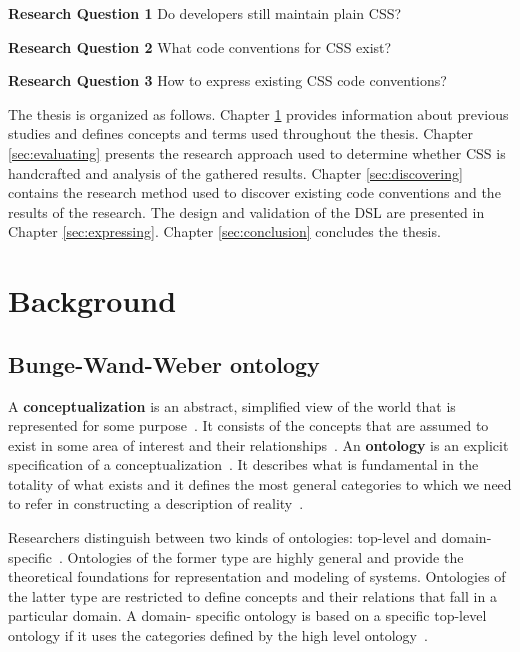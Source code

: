 \documentclass[parskip=full]{uvamscse}
\begin{document}
  \begin{description}
    \item \textbf{Research Question 1} Do developers still maintain plain CSS?
    \item \textbf{Research Question 2} What code conventions for CSS exist?
    \item \textbf{Research Question 3} How to express existing CSS code conventions?
  \end{description}

The thesis is organized as follows. Chapter \ref{sec:background} provides information about previous
studies and defines concepts and terms used throughout the thesis. Chapter \ref{sec:evaluating}
presents the research approach used to determine whether CSS is handcrafted and analysis of the
gathered results. Chapter \ref{sec:discovering} contains the research method  used to discover
existing code conventions and the results of the research. The design and validation of the DSL are
presented in Chapter \ref{sec:expressing}. Chapter \ref{sec:conclusion} concludes the thesis.


\chapter{Background}
\label{sec:background}

\section{Bunge-Wand-Weber ontology}

A \textbf{conceptualization} is an abstract, simplified view of the world that is represented for
some purpose~\cite{gruber1995toward}. It consists of the concepts that are assumed to exist in some
area of interest and their relationships~\cite{gruber1995toward}. An \textbf{ontology} is an
explicit specification of a conceptualization~\cite{gruber1995toward}. It describes what is
fundamental in the totality of what exists and it defines the most general categories to which we
need to refer in constructing a description of reality~\cite{milton2004top}.

Researchers distinguish between two kinds of ontologies: top-level and domain-
specific~\cite{milton2004top}. Ontologies of the former type are highly general and provide the
theoretical foundations for representation and modeling of systems. Ontologies of the latter type
are restricted to define concepts and their relations that fall in a particular domain. A domain-
specific ontology is based on a specific top-level ontology if it uses the categories defined by the
high level ontology~\cite{milton2004top}.
\end{document}
